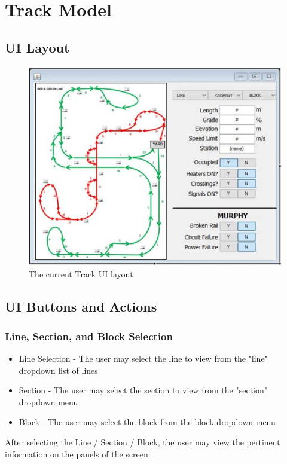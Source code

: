 \documentclass[letterpaper]{article}
\begin{document}
\maketitle


\section{Track Model}

\subsection{UI Layout}
\begin{figure}[h]
	\centering
	\includegraphics{trackUI}
	\caption{The current Track UI layout}
\end{figure}


\subsection{UI Buttons and Actions}

	\subsubsection{Line, Section, and Block Selection}
		\begin{itemize}
			\item Line Selection - The user may select the line to view from the "line" dropdown list of lines
			\item Section - The user may select the section to view from the "section" dropdown menu
			\item Block - The user may select the block from the block dropdown menu
		\end{itemize}
		After selecting the Line / Section / Block, the user may view the pertinent information on the panels of the screen.
\end{document}
